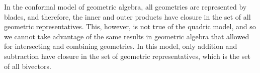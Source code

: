 \documentclass{ecgd-l}
\theoremstyle{definition}
\theoremstyle{remark}
\numberwithin{equation}{section}
\begin{document}
In the conformal model of geometric algebra, all geometries
are represented by blades, and therefore, the inner and outer products have closure
in the set of all geometric representatives.  This, however, is not true of the quadric
model, and so we cannot take advantage of the same results in geometric
algebra that allowed for intersecting and combining geometries.
In this model, only addition and subtraction have closure in the set
of geometric representatives, which is the set of all bivectors.









\end{document}
